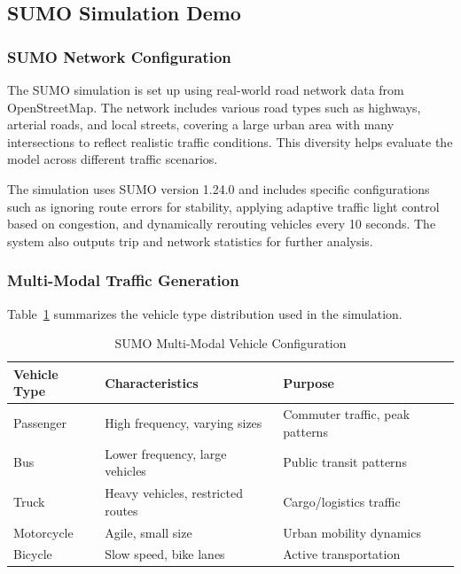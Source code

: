 \documentclass[pdflatex,sn-mathphys-num]{sn-jnl}
\theoremstyle{thmstyleone}
\theoremstyle{thmstyletwo}
\theoremstyle{thmstylethree}
\begin{document}
\subsection{SUMO Simulation Demo}

\subsubsection{SUMO Network Configuration}

The SUMO simulation \cite{lopez2018sumo} is set up using real-world road network data from OpenStreetMap. The network includes various road types such as highways, arterial roads, and local streets, covering a large urban area with many intersections to reflect realistic traffic conditions. This diversity helps evaluate the model across different traffic scenarios.

The simulation uses SUMO version 1.24.0 \cite{lopez2018sumo} and includes specific configurations such as ignoring route errors for stability, applying adaptive traffic light control based on congestion, and dynamically rerouting vehicles every 10 seconds. The system also outputs trip and network statistics for further analysis.

\subsubsection{Multi-Modal Traffic Generation}

Table~\ref{tab:vehicle_types} summarizes the vehicle type distribution used in the simulation.

\begin{table}[h]
\caption{SUMO Multi-Modal Vehicle Configuration}\label{tab:vehicle_types}
\begin{tabular}{@{}lll@{}}
\toprule
\textbf{Vehicle Type} & \textbf{Characteristics} & \textbf{Purpose} \\
\midrule
Passenger  & High frequency, varying sizes    & Commuter traffic, peak patterns \\
Bus        & Lower frequency, large vehicles  & Public transit patterns \\
Truck      & Heavy vehicles, restricted routes & Cargo/logistics traffic \\
Motorcycle & Agile, small size                & Urban mobility dynamics \\
Bicycle    & Slow speed, bike lanes           & Active transportation \\
\bottomrule
\end{tabular}
\end{table}
\end{document}
